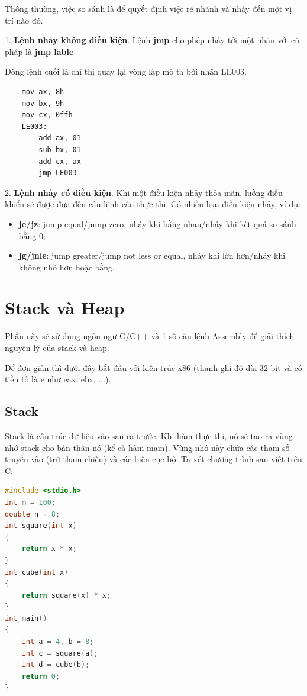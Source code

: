 Thông thường, việc so sánh là để quyết định việc rẽ nhánh và nhảy đến một vị trí nào đó.

1. \textbf{Lệnh nhảy không điều kiện}. Lệnh \textbf{jmp} cho phép nhảy tới một nhãn với cú pháp là \textbf{jmp lable}

\begin{example}
    Dòng lệnh cuối là chỉ thị quay lại vòng lặp mô tả bởi nhãn LE003.
    \begin{lstlisting}
    mov ax, 8h
    mov bx, 9h
    mov cx, 0ffh
    LE003:
        add ax, 01
        sub bx, 01
        add cx, ax
        jmp LE003 
    \end{lstlisting}
\end{example}

2. \textbf{Lệnh nhảy có điều kiện}. Khi một điều kiện nhảy thỏa mãn, luồng điều khiển sẽ được đưa đến câu lệnh cần thực thi. Có nhiều loại điều kiện nhảy, ví dụ:

\begin{itemize}
    \item \textbf{je/jz}: jump equal/jump zero, nhảy khi bằng nhau/nhảy khi kết quả so sánh bằng 0;
    \item \textbf{jg/jnle}: jump greater/jump not less or equal, nhảy khi lớn hơn/nhảy khi không nhỏ hơn hoặc bằng.
\end{itemize}

\section{Stack và Heap}

Phần này sẽ sử dụng ngôn ngữ C/C++ và 1 số câu lệnh Assembly để giải thích nguyên lý của stack và heap.

Để đơn giản thì dưới đây bắt đầu với kiến trúc x86 (thanh ghi độ dài 32 bit và có tiền tố là e như eax, ebx, ...).

\subsection*{Stack}

Stack là cấu trúc dữ liệu vào sau ra trước. Khi hàm thực thi, nó sẽ tạo ra vùng nhớ stack cho bản thân nó (kể cả hàm main). Vùng nhớ này chứa các tham số truyền vào (trừ tham chiếu) và các biến cục bộ. Ta xét chương trình sau viết trên C:

\begin{lstlisting}[language=C++]
#include <stdio.h>
int m = 100;
double n = 8;
int square(int x)
{
    return x * x;
}
int cube(int x)
{
    return square(x) * x;
}
int main()
{
    int a = 4, b = 8;
    int c = square(a);
    int d = cube(b);
    return 0;
}
\end{lstlisting}

